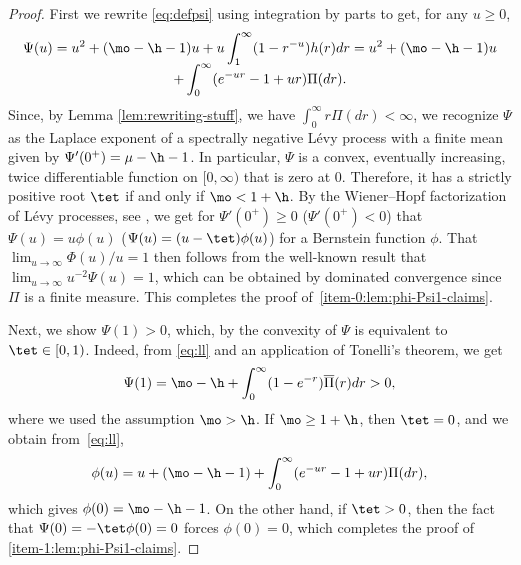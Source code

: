 \begin{proof}
First we rewrite \eqref{eq:defpsi} using integration by parts to get, for any $u\geq0$,
\begin{multline}
\label{eq:ll}
\Psi(u) = u^2+(\mo-\h-1)u+u\int_1^\infty (1-r^{-u})h(r)dr = u^2+(\mo-\h-1)u\\[-5pt]
+ \int_0^\infty (e^{-ur}-1+ur)\Pi(dr).
\end{multline}
Since, by Lemma \ref{lem:rewriting-stuff}, we have $\int_0^\infty r\Pi(dr) < \infty$, we recognize $\Psi$ as the Laplace exponent of a spectrally negative Lévy process with a finite mean given by $\Psi'(0^+)=\mu-\h-1$. In particular, $\Psi$ is a convex, eventually increasing, twice differentiable function on $[0,\infty)$ that is zero at $0$. Therefore, it has a strictly positive root $\tet$ if and only if $\mo < 1+\h$. By the Wiener--Hopf factorization of Lévy processes, see \eg \cite[Chap.\,6.4]{Kyprianou2014}, we get for $\Psi'(0^+) \geq 0$ (\resp $\Psi'(0^+) < 0$) that $\Psi(u) = u\phi(u)$ (\resp $\Psi(u) = (u-\tet)\phi(u)$) for a Bernstein function $\phi$. That $\lim_{u \to \infty} \Phi(u)/u = 1$ then follows from the well-known result that $\lim_{u \to \infty} u^{-2}\Psi(u) = 1$, which can be obtained by dominated convergence since $\Pi$ is a finite measure. This completes the proof of~\eqref{item-0:lem:phi-Psi1-claims}.

Next, we show $\Psi(1) > 0$, which, by the convexity of $\Psi$ is equivalent to $\tet \in [0,1)$. Indeed, from \eqref{eq:ll} and an application of Tonelli's theorem, we get
\begin{equation*}
\Psi(1) = \mo-\h + \int_0^\infty (1-e^{-r})\overline{\Pi}(r)dr > 0,
\end{equation*}
where we used the assumption $\mo > \h$. If $\mo \geq 1 + \h$, then $\tet = 0$, and we obtain from~\eqref{eq:ll},
\begin{equation*}
\phi(u) = u+(\mo-\h-1)+ \int_0^\infty (e^{-ur}-1+ur)\Pi(dr),
\end{equation*}
which gives $\phi(0) = \mo - \h - 1$. On the other hand, if $\tet > 0$, then the fact that $\Psi(0)=-\tet\phi(0) = 0$ forces $\phi(0)=0$, which completes the proof of \eqref{item-1:lem:phi-Psi1-claims}.


\end{proof}
